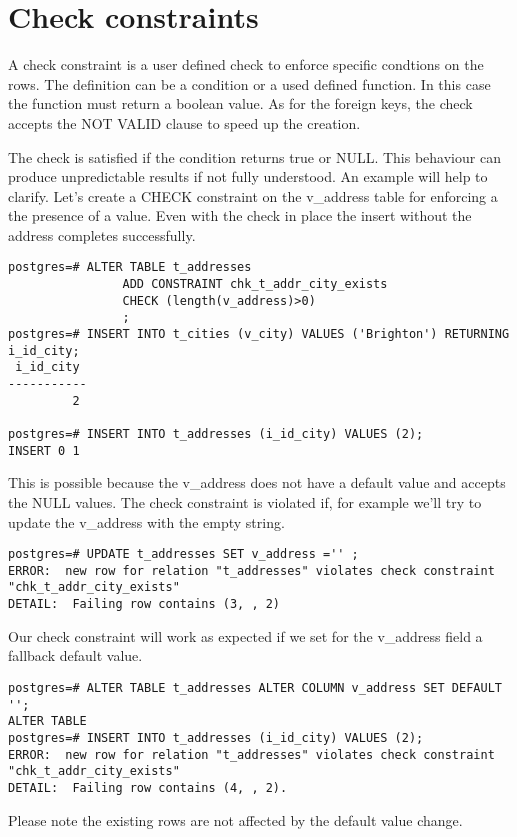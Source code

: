 \section{Check constraints}
\label{sec:CHECKCNS}

A check constraint is a user defined check to enforce specific condtions on the rows. 
The definition can be a condition or a used defined function. In this case the function must return 
a boolean value.  As for the foreign keys, the check accepts the NOT VALID clause to speed up the 
creation.\newline

The check is satisfied if the condition returns true or NULL. This behaviour can 
produce unpredictable results if not fully understood. An example will help to clarify. 
Let's create a CHECK constraint on the v\_address table for enforcing a the presence of a value.
Even with the check in place the insert without the address completes successfully.

\begin{lstlisting}[style=pgsql]
postgres=# ALTER TABLE t_addresses
                ADD CONSTRAINT chk_t_addr_city_exists
                CHECK (length(v_address)>0)
                ; 
postgres=# INSERT INTO t_cities (v_city) VALUES ('Brighton') RETURNING i_id_city;
 i_id_city 
-----------
         2

postgres=# INSERT INTO t_addresses (i_id_city) VALUES (2);
INSERT 0 1
\end{lstlisting}


This is possible because the v\_address does not have a default value and accepts the NULL 
values. The check constraint is violated if, for example we'll try to update the v\_address with 
the empty string.

\begin{lstlisting}[style=pgsql]
postgres=# UPDATE t_addresses SET v_address ='' ;
ERROR:  new row for relation "t_addresses" violates check constraint "chk_t_addr_city_exists"
DETAIL:  Failing row contains (3, , 2)
\end{lstlisting}

Our check constraint will work as expected if we set for the v\_address field a fallback default 
value.

\begin{lstlisting}[style=pgsql]
postgres=# ALTER TABLE t_addresses ALTER COLUMN v_address SET DEFAULT '';
ALTER TABLE
postgres=# INSERT INTO t_addresses (i_id_city) VALUES (2);
ERROR:  new row for relation "t_addresses" violates check constraint "chk_t_addr_city_exists"
DETAIL:  Failing row contains (4, , 2).

\end{lstlisting}
Please note the existing rows are not affected by the default value change.

